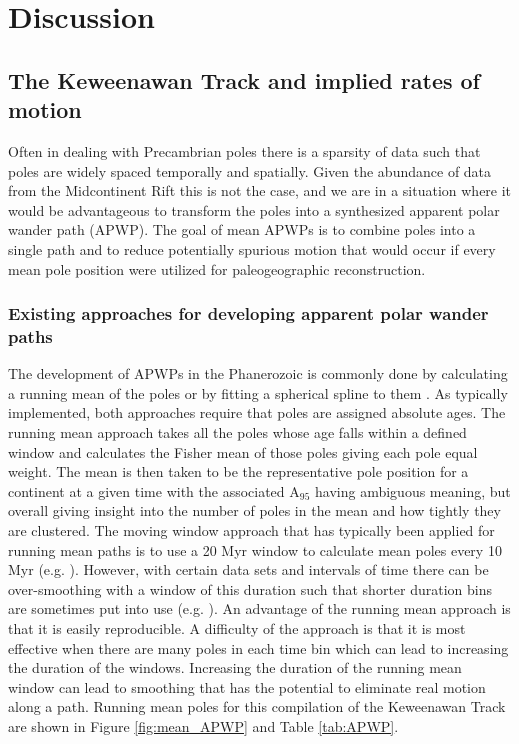 \documentclass[11pt,letterpaper]{article}
\begin{document}
\section{Discussion}

\subsection{The Keweenawan Track and implied rates of motion}

Often in dealing with Precambrian poles there is a sparsity of data such that poles are widely spaced temporally and spatially. Given the abundance of data from the Midcontinent Rift this is not the case, and we are in a situation where it would be advantageous to transform the poles into a synthesized apparent polar wander path (APWP). The goal of mean APWPs is to combine poles into a single path and to reduce potentially spurious motion that would occur if every mean pole position were utilized for paleogeographic reconstruction.

\subsubsection{Existing approaches for developing apparent polar wander paths}

The development of APWPs in the Phanerozoic is commonly done by calculating a running mean of the poles or by fitting a spherical spline to them \citep{Torsvik2008a,Torsvik2012a}. As typically implemented, both approaches require that poles are assigned absolute ages. The running mean approach takes all the poles whose age falls within a defined window and calculates the Fisher mean of those poles giving each pole equal weight. The mean is then taken to be the representative pole position for a continent at a given time with the associated A$_{95}$ having ambiguous meaning, but overall giving insight into the number of poles in the mean and how tightly they are clustered. The moving window approach that has typically been applied for running mean paths is to use a 20 Myr window to calculate mean poles every 10 Myr (e.g. \citealp{Torsvik2012a}). However, with certain data sets and intervals of time there can be over-smoothing with a window of this duration such that shorter duration bins are sometimes put into use (e.g. \citealp{Torsvik2008a}). An advantage of the running mean approach is that it is easily reproducible. A difficulty of the approach is that it is most effective when there are many poles in each time bin which can lead to increasing the duration of the windows. Increasing the duration of the running mean window can lead to smoothing that has the potential to eliminate real motion along a path. Running mean poles for this compilation of the Keweenawan Track are shown in Figure \ref{fig:mean_APWP} and Table \ref{tab:APWP}.
\end{document}
